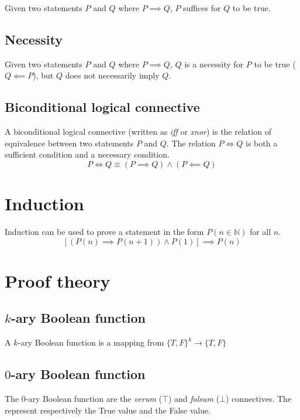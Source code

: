 \documentclass[a4paper]{article}
\begin{document}
Given two statements \(P\) and \(Q\) where \(P \implies Q\),
\(P\) suffices for \(Q\) to be true.

\subsection{Necessity}

Given two statements \(P\) and \(Q\) where \(P \implies Q\),
\(Q\) is a necessity for \(P\) to be true (\(Q \impliedby P\)), but
\(Q\) does not necessarily imply \(Q\).

\subsection{Biconditional logical connective}

A biconditional logical connective (written as \textit{iff} or \textit{xnor})
is the relation of equivalence
between two statements \(P\) and \(Q\).
The relation \(P \iff Q\) is both a sufficient condition and
a necessary condition.
\[
    P \iff Q
    \equiv
    (P \implies Q) \land (P \impliedby Q)
\]

\pagebreak

\section{Induction}

Induction can be used to prove a statement in the form \(P(n \in \mathbb{N})\)
for all \(n\).
\[
    [(P(n) \implies P(n+1)) \land P(1)] \implies P(n)
\]

\pagebreak

\section{Proof theory}

\subsection{\(k\)-ary Boolean function}

A \(k\)-ary Boolean function is a mapping from \({\{T, F\}}^k \to \{T,F\}\)

\subsection{\(0\)-ary Boolean function}

The \(0\)-ary Boolean function are the \textit{verum} (\(\top\)) and \textit{falsum} (\(\bot\)) connectives.
The represent respectively the True value and the False value.
\end{document}
